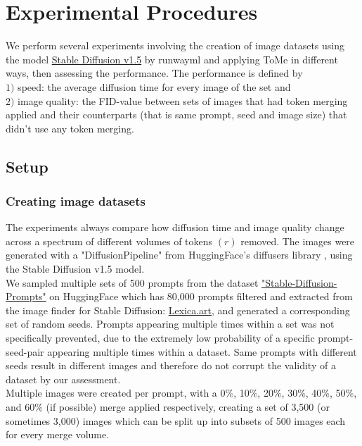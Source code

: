 \section{Experimental Procedures} \label{experiments}
We perform several experiments involving the creation of image datasets using the model \href{https://huggingface.co/runwayml/stable-diffusion-v1-5}{Stable Diffusion v1.5} by runwayml \cite{Rombach_2022_CVPR} and applying ToMe in different ways, then assessing the performance.
The performance is defined by\\ 
\(1)\) speed: the average diffusion time for every image of the set and\\
\(2)\) image quality: the FID-value between sets of images that had token merging applied and their counterparts (that is same prompt, seed and image size) that didn't use any token merging.



\subsection{Setup}
\subsubsection*{Creating image datasets}
The experiments always compare how diffusion time and image quality change across a spectrum of different volumes of tokens \((r)\) removed.
The images were generated with a "DiffusionPipeline" from HuggingFace's diffusers library \cite{von-platen-etal-2022-diffusers}, using the Stable Diffusion v1.5 model.\\
We sampled multiple sets of 500 prompts from the dataset \href{https://huggingface.co/datasets/Gustavosta/Stable-Diffusion-Prompts}{"Stable-Diffusion-Prompts"} on HuggingFace which has 80,000 prompts filtered and extracted from the image finder for Stable Diffusion: \href{https://lexica.art}{Lexica.art}, and generated a corresponding set of random seeds.
Prompts appearing multiple times within a set was not specifically prevented, due to the extremely low probability of a specific prompt-seed-pair appearing multiple times within a dataset. Same prompts with different seeds result in different images and therefore do not corrupt the validity of a dataset by our assessment.\\
Multiple images were created per prompt, with a 0\%, 10\%, 20\%, 30\%, 40\%, 50\%, and 60\% (if possible) merge applied respectively, creating a set of 3,500 (or sometimes 3,000) images which can be split up into subsets of 500 images each for every merge volume.



